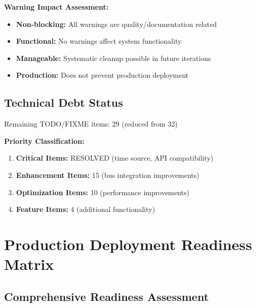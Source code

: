 \documentclass[11pt,a4paper]{article}
\newcommand{\warning}[1]{\textcolor{warningorange}{\textbf{#1}}}
\newcommand{\success}[1]{\textcolor{successgreen}{\textbf{#1}}}
\newcommand{\info}[1]{\textcolor{infoblue}{\textbf{#1}}}
\begin{document}
\textbf{Warning Impact Assessment:}
\begin{itemize}
    \item \info{Non-blocking:} All warnings are quality/documentation related
    \item \info{Functional:} No warnings affect system functionality
    \item \info{Manageable:} Systematic cleanup possible in future iterations
    \item \info{Production:} Does not prevent production deployment
\end{itemize}

\subsection{Technical Debt Status}

Remaining TODO/FIXME items: 29 (reduced from 32)

\textbf{Priority Classification:}
\begin{enumerate}
    \item \success{\textbf{Critical Items:}} RESOLVED (time source, API compatibility)
    \item \warning{\textbf{Enhancement Items:}} 15 (bus integration improvements)
    \item \info{\textbf{Optimization Items:}} 10 (performance improvements)  
    \item \info{\textbf{Feature Items:}} 4 (additional functionality)
\end{enumerate}

\section{Production Deployment Readiness Matrix}

\subsection{Comprehensive Readiness Assessment}
\end{document}

